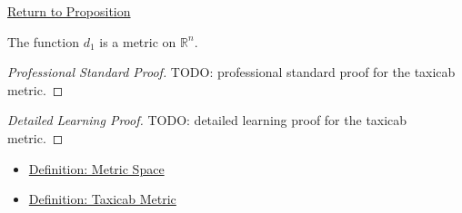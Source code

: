 \newpage
{}
\label{prf:taxicab-metric-rn}

\begin{remark*}[Return]
\hyperref[prop:taxicab-metric-rn]{Return to Proposition}
\end{remark*}

\begin{proposition*}
The function \(d_1\) is a metric on \(\mathbb{R}^n\).
\end{proposition*}

\begin{proof}[Professional Standard Proof]
\LRAProofBodyStart
TODO: professional standard proof for the taxicab metric.
\end{proof}

\begin{proof}[Detailed Learning Proof]
\LRAProofBodyStart
TODO: detailed learning proof for the taxicab metric.
\end{proof}

\begin{remark*}
\end{remark*}

\begin{dependencies}
\begin{itemize}
  \item \hyperref[def:metric-space]{Definition: Metric Space}
  \item \hyperref[def:taxicab-metric-rn]{Definition: Taxicab Metric}
\end{itemize}
\end{dependencies}

\clearpage
